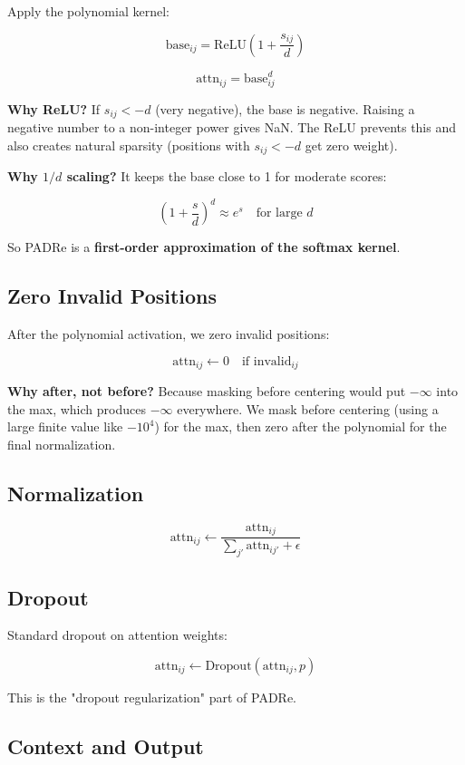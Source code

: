 Apply the polynomial kernel:

\[
\text{base}_{ij} = \text{ReLU}\!\left(1 + \frac{s_{ij}}{d}\right)
\tag{4.5}
\]

\[
\text{attn}_{ij} = \text{base}_{ij}^d
\tag{4.6}
\]

\textbf{Why ReLU?} If $s_{ij} < -d$ (very negative), the base is negative. Raising 
a negative number to a non-integer power gives NaN. The ReLU prevents this 
and also creates natural sparsity (positions with $s_{ij} < -d$ get zero weight).

\textbf{Why $1/d$ scaling?} It keeps the base close to 1 for moderate scores:

\[
\left(1 + \frac{s}{d}\right)^d \approx e^s \quad \text{for large } d
\tag{4.7}
\]

So PADRe is a \textbf{first-order approximation of the softmax kernel}.

\subsection{Zero Invalid Positions}

After the polynomial activation, we zero invalid positions:

\[
\text{attn}_{ij} \leftarrow 0 \quad \text{if invalid}_{ij}
\tag{4.8}
\]

\textbf{Why after, not before?} Because masking before centering would put 
$-\infty$ into the max, which produces $-\infty$ everywhere. We mask 
before centering (using a large finite value like $-10^4$) for the max, 
then zero after the polynomial for the final normalization.

\subsection{Normalization}

\[
\text{attn}_{ij} \leftarrow \frac{\text{attn}_{ij}}{\sum_{j'} \text{attn}_{ij'} + \epsilon}
\tag{4.9}
\]

\subsection{Dropout}

Standard dropout on attention weights:

\[
\text{attn}_{ij} \leftarrow \text{Dropout}(\text{attn}_{ij}, p)
\tag{4.10}
\]

This is the "dropout regularization" part of PADRe.

\subsection{Context and Output}


